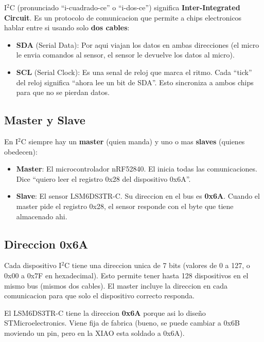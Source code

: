 \documentclass[11pt,a4paper]{article}
\begin{document}
I$^2$C (pronunciado ``i-cuadrado-ce'' o ``i-dos-ce'') significa
\textbf{Inter-Integrated Circuit}. Es un protocolo de comunicacion
que permite a chips electronicos hablar entre si usando solo
\textbf{dos cables}:

\begin{itemize}
    \item \textbf{SDA} (Serial Data): Por aqui viajan los datos
          en ambas direcciones (el micro le envia comandos al sensor,
          el sensor le devuelve los datos al micro).
    \item \textbf{SCL} (Serial Clock): Es una senal de reloj que
          marca el ritmo. Cada ``tick'' del reloj significa
          ``ahora lee un bit de SDA''. Esto sincroniza a ambos
          chips para que no se pierdan datos.
\end{itemize}

\subsection{Master y Slave}

En I$^2$C siempre hay un \textbf{master} (quien manda) y uno o
mas \textbf{slaves} (quienes obedecen):

\begin{itemize}
    \item \textbf{Master}: El microcontrolador nRF52840. El inicia
          todas las comunicaciones. Dice ``quiero leer el registro
          0x28 del dispositivo 0x6A''.
    \item \textbf{Slave}: El sensor LSM6DS3TR-C. Su direccion en
          el bus es \textbf{0x6A}. Cuando el master pide el
          registro 0x28, el sensor responde con el byte que tiene
          almacenado ahi.
\end{itemize}

\subsection{Direccion 0x6A}

Cada dispositivo I$^2$C tiene una direccion unica de 7 bits (valores
de 0 a 127, o 0x00 a 0x7F en hexadecimal). Esto permite tener
hasta 128 dispositivos en el mismo bus (mismos dos cables). El
master incluye la direccion en cada comunicacion para que solo el
dispositivo correcto responda.

El LSM6DS3TR-C tiene la direccion \textbf{0x6A} porque asi lo
diseño STMicroelectronics. Viene fija de fabrica (bueno, se puede
cambiar a 0x6B moviendo un pin, pero en la XIAO esta soldado a
0x6A).
\end{document}
